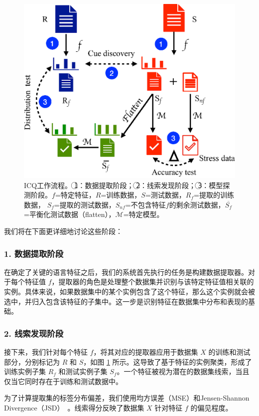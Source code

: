 \begin{figure}[th]
\centering
\includegraphics[width=0.8\columnwidth]{figures/emnlp/framework.eps}
\caption{ICQ工作流程。 \textcircled{1}：数据提取阶段； \textcircled{2}：线索发现阶段；
\textcircled{3}：模型探测阶段。$f$=特定特征，$R$=训练数据，$S$=测试数据，$R_f$=提取的训练数据，
$S_f$=提取的测试数据，$S_{nf}$=不包含特征$f$的剩余测试数据，$\overline{S_f}$=平衡化测试数据（flatten），$\mathcal{M}$=特定模型。}
\label{fig4:framework}
\end{figure}

我们将在下面更详细地讨论这些阶段：
\subsubsection*{1. 数据提取阶段}
\label{sec4:evaldata}
在确定了关键的语言特征之后，我们的系统首先执行的任务是构建数据提取器。对于每个特征值 \(f\)，提取器的角色是处理整个数据集并识别与该特定特征值相关联的实例。具体来说，如果数据集中的某个实例包含了这个特征，那么这个实例就会被选中，并归入包含该特征的子集中。这一步是识别特征在数据集中分布和表现的基础。

\subsubsection*{2. 线索发现阶段}
\label{sec4:cuenessdiscovery}

接下来，我们针对每个特征 \(f\)，将其对应的提取器应用于数据集 \(X\) 的训练和测试部分，分别标记为 \(R\) 和 \(S\)，如图 \ref{fig4:framework} 所示。这导致了基于特征的实例聚类，形成了训练实例子集 \(R_f\) 和测试实例子集 \(S_f\)。一个特征被视为潜在的数据集线索，当且仅当它同时存在于训练和测试数据中。

为了计算提取集的标签分布偏差，我们使用均方误差（MSE）和Jensen-Shannon Divergence（JSD）~\cite{lin1991divergence}。线索得分反映了数据集 \(X\) 针对特征 \(f\) 的偏见程度。

